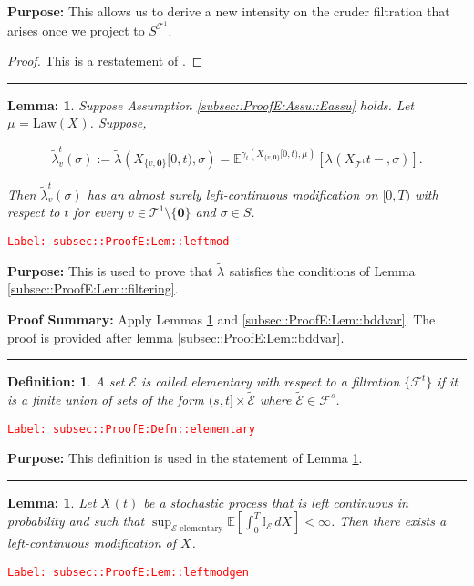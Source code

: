 \documentclass[12pt]{article}
\newcommand{\mb}{\mathbb}
\newcommand{\mc}{\mathcal}
\newcommand{\te}{\text}
\newcommand{\tr}{\textcolor{red}}
\newcommand{\labe}[1]{\tr{\texttt{Label: #1}}}
\newcommand{\purpose}{\textbf{Purpose: }}
\newcommand{\pfsum}{\textbf{Proof Summary: }}
\newcommand{\lin}{\rule{\linewidth}{0.4 pt}}
\newcommand{\ex}[1]{\mb{E}\left[#1\right]}			%
\newcommand{\exmu}[2]{\mb{E}^{#1}\left[#2\right]}	%
\renewcommand{\root}{\mathbf{0}}				%
\renewcommand{\v}{v}							%
\renewcommand{\S}{S}							%
\newcommand{\s}{\sigma}							%
\newcommand{\T}{T}								%
\renewcommand{\t}{t}							%
\newcommand{\law}{\te{Law}}							%
\newcommand{\pup}[1]{^{#1}}							%
\newcommand{\tree}{\mc{T}}							%
\renewcommand{\tt}{s}								%
\newcommand{\rxvt}[2]{X_{#1}{(#2)}}					%
\newcommand{\rxvts}[2]{X_{#1}{#2}}					%
\newcommand{\m}[3]{\mu_{#2#1}^{#3}}						%
\newcommand{\cm}{\gamma}							%
\newcommand{\rate}[1]{\lambda_{#1}}					%
\newcommand{\crate}[2]{\alt{\lambda}_{#1}^{#2}}		%
\newcommand{\F}[2]{\mc{F}_{#1}^{#2}}				%
\newcommand{\alt}{\widetilde}						%
\newcommand{\evnt}{\mc{E}}						%
\newtheorem{lem}[thms]{Lemma: }
\newtheorem{defn}[thms]{Definition: }
\begin{document}
\purpose This allows us to derive a new intensity on the cruder filtration that arises once we project to \(\S^{\tree^1}\).

\begin{proof}
This is a restatement of \cite[Theorem 14.3.III]{DalVer08}.
\end{proof}

\lin

\begin{lem}
Suppose Assumption \ref{subsec::ProofE:Assu::Eassu} holds. Let \(\m{}{}{} = \law(\rxvts{}{})\). Suppose,

\[\crate{\v}{\t}(\s) := \crate{}{}(\rxvts{\{\v,\root\}}{[0,\t)},\s) = \exmu{\cm_\t(\rxvts{\{\v,\root\}}{[0,\t)},\m{}{}{})}{\rate{}(\rxvts{\tree\pup{1}}{\t-},\s)}.\]


Then \(\crate{\v}{\t}(\s)\) has an almost surely left-continuous modification on \([0,\T)\) with respect to \(\t\) for every \(\v \in \tree\pup{1}\setminus\{\root\}\) and \(\s \in \S\).
\label{subsec::ProofE:Lem::leftmod}
\end{lem}
\labe{subsec::ProofE:Lem::leftmod}

\purpose This is used to prove that \(\crate{}{}\) satisfies the conditions of Lemma \ref{subsec::ProofE:Lem::filtering}.

\pfsum Apply Lemmas \ref{subsec::ProofE:Lem::leftmodgen} and \ref{subsec::ProofE:Lem::bddvar}. The proof is provided after lemma \ref{subsec::ProofE:Lem::bddvar}.

\lin

\begin{defn}
A set \(\evnt\) is called elementary with respect to a filtration \(\{\F{}{\t}\}\) if it is a finite union of sets of the form \((\tt,\t]\times \alt{\evnt}\) where \(\alt{\evnt} \in \F{}{\tt}\).
\label{subsec::ProofE:Defn::elementary}
\end{defn}
\labe{subsec::ProofE:Defn::elementary}

\purpose This definition is used in the statement of Lemma \ref{subsec::ProofE:Lem::leftmodgen}.

\lin

\begin{lem}
Let \(\rxvt{}{\t}\) be a stochastic process that is left continuous in probability and such that \(\sup_{\evnt\te{ elementary}}\ex{\int_0^\T \mb{I}_\evnt\,d\rxvts{}{}} < \infty\). Then there exists a left-continuous modification of \(\rxvts{}{}\).
\label{subsec::ProofE:Lem::leftmodgen}
\end{lem}
\labe{subsec::ProofE:Lem::leftmodgen}
\end{document}
